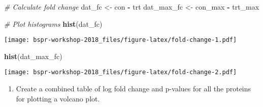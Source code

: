 \documentclass[12pt,]{book}
\newenvironment{Shaded}{\begin{snugshade}}{\end{snugshade}}
\newcommand{\KeywordTok}[1]{\textcolor[rgb]{0.13,0.29,0.53}{\textbf{#1}}}
\newcommand{\DataTypeTok}[1]{\textcolor[rgb]{0.13,0.29,0.53}{#1}}
\newcommand{\DecValTok}[1]{\textcolor[rgb]{0.00,0.00,0.81}{#1}}
\newcommand{\StringTok}[1]{\textcolor[rgb]{0.31,0.60,0.02}{#1}}
\newcommand{\CommentTok}[1]{\textcolor[rgb]{0.56,0.35,0.01}{\textit{#1}}}
\newcommand{\OperatorTok}[1]{\textcolor[rgb]{0.81,0.36,0.00}{\textbf{#1}}}
\newcommand{\NormalTok}[1]{#1}
\providecommand{\tightlist}{%
  \setlength{\itemsep}{0pt}\setlength{\parskip}{0pt}}
\theoremstyle{definition}
\theoremstyle{definition}
\theoremstyle{definition}
\theoremstyle{remark}
\begin{document}
\begin{Shaded}
\begin{Highlighting}[]
\CommentTok{# Calculate fold change}
\NormalTok{dat_fc <-}\StringTok{ }\NormalTok{con }\OperatorTok{-}\StringTok{ }\NormalTok{trt}
\NormalTok{dat_max_fc <-}\StringTok{ }\NormalTok{con_max }\OperatorTok{-}\StringTok{ }\NormalTok{trt_max}

\CommentTok{# Plot histograms}
\KeywordTok{hist}\NormalTok{(dat_fc)}
\end{Highlighting}
\end{Shaded}

\texttt{[image: bspr-workshop-2018\_files/figure-latex/fold-change-1.pdf]}

\begin{Shaded}
\begin{Highlighting}[]
\KeywordTok{hist}\NormalTok{(dat_max_fc)}
\end{Highlighting}
\end{Shaded}

\texttt{[image: bspr-workshop-2018\_files/figure-latex/fold-change-2.pdf]}

\begin{enumerate}
\def\labelenumi{\arabic{enumi}.}
\setcounter{enumi}{6}
\tightlist
\item
  Create a combined table of log fold change and p-values for all the
  proteins for plotting a volcano plot.
\end{enumerate}

\begin{Shaded}
\end{Shaded}
\end{document}
